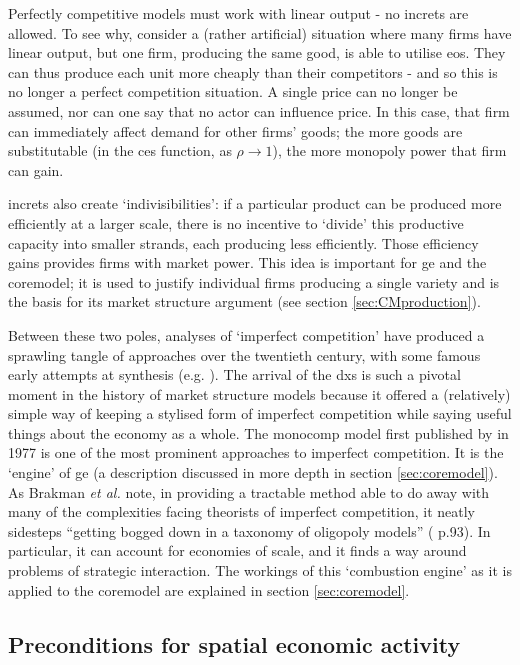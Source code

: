 Perfectly competitive models must work with linear output - no \gls{increts} are allowed. To see why, consider a (rather artificial) situation where many firms have linear output, but one firm, producing the same good, is able to utilise \gls{eos}. They can thus produce each unit more cheaply than their competitors - and so this is no longer a perfect competition situation. A single price can no longer be assumed, nor can one say that no actor can influence price. In this case, that firm can immediately affect demand for other firms' goods; the more goods are substitutable (in the \gls{ces} function, as $\rho \rightarrow 1$), the more monopoly power that firm can gain.

\Gls{increts} also create `indivisibilities': if a particular product can be produced more efficiently at a larger scale, there is no incentive to `divide' this productive capacity into smaller strands, each producing less efficiently. Those efficiency gains provides firms with market power. This idea is important for \gls{ge} and the \gls{coremodel}; it is used to justify individual firms producing a single variety and is the basis for its market structure argument (see section \ref{sec:CMproduction}).

Between these two poles, analyses of `imperfect competition' have produced a sprawling tangle of approaches over the twentieth century, with some famous early attempts at synthesis (e.g. \citealt{robinson_economics_1933}). The arrival of the \gls{dxs} is such a pivotal moment in the history of market structure models because it offered a (relatively) simple way of keeping a stylised form of imperfect competition while saying useful things about the economy as a whole. The \gls{monocomp} model first published by \citeauthor{dixit_monopolistic_1977} in 1977 is one of the most prominent approaches to imperfect competition. It is the `engine' of \gls{ge} (a description discussed in more depth in section \ref{sec:coremodel}). As Brakman \emph{et al.} note, in providing a tractable method able to do away with many of the complexities facing theorists of imperfect competition, it neatly sidesteps ``getting bogged down in a taxonomy of oligopoly models'' (\citealt{brakman_new_2009} p.93). In particular, it can account for economies of scale, and it finds a way around problems of strategic interaction. The workings of this `combustion engine' as it is applied to the \gls{coremodel} are explained in section \ref{sec:coremodel}.


\subsection{Preconditions for spatial economic activity \label{sec:marketstructnspace}}

